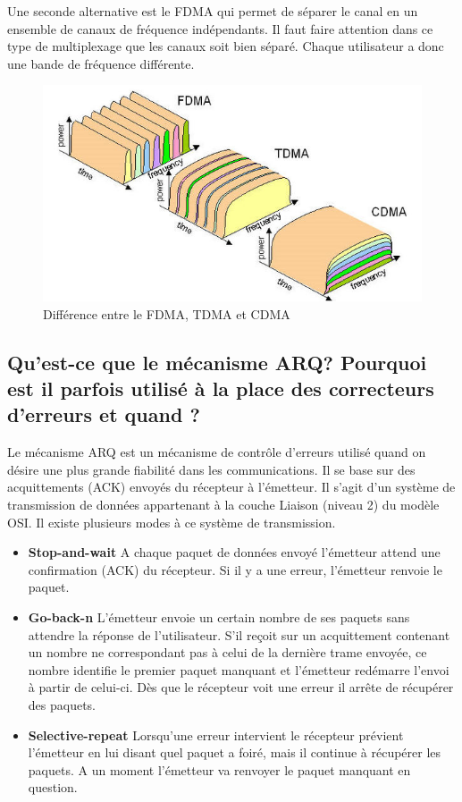 Une seconde alternative est le FDMA qui permet de séparer le canal en un ensemble de canaux de fréquence indépendants. Il faut faire attention dans ce type de multiplexage que les canaux soit bien séparé. Chaque utilisateur a donc une bande de fréquence différente.

\begin{figure}[H]
    \centering
    \includegraphics[width=0.65\linewidth]{img/fdma_tdma_cdma.png}
    \caption{Différence entre le FDMA, TDMA et CDMA}
\end{figure}

\subsection{Qu'est-ce que le mécanisme ARQ? Pourquoi est il parfois
    utilisé à la place des correcteurs d'erreurs et quand ?}

Le mécanisme ARQ est un mécanisme de contrôle d'erreurs utilisé quand on désire une plus grande fiabilité dans les communications. Il se base sur des acquittements (ACK) envoyés du récepteur à l'émetteur.  Il s'agit d'un système de transmission de données appartenant à la couche Liaison (niveau 2) du modèle OSI. Il existe plusieurs modes à ce système de transmission.
\begin{itemize}
	\item \textbf{Stop-and-wait} A chaque paquet de données envoyé l'émetteur attend une confirmation (ACK) du récepteur. Si il y a une erreur, l'émetteur renvoie le paquet. 
	\item \textbf{Go-back-n} L'émetteur envoie un certain nombre de ses paquets sans attendre la réponse de l'utilisateur. S'il reçoit sur un acquittement contenant un nombre ne correspondant pas à celui de la dernière trame envoyée, ce nombre identifie le premier paquet manquant et l'émetteur redémarre l'envoi à partir de celui-ci. Dès que le récepteur voit une erreur il arrête de récupérer des paquets.
	\item \textbf{Selective-repeat} Lorsqu'une erreur intervient le récepteur prévient l'émetteur en lui disant quel paquet a foiré, mais il continue à récupérer les paquets. A un moment l'émetteur va renvoyer le paquet manquant en question.
\end{itemize}

